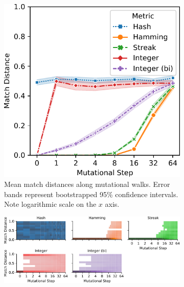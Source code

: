 \begin{figure}[!htbp]
\begin{center}

\begin{subfigure}[b]{\linewidth}
\begin{minipage}{\linewidth}
\centering
\includegraphics[width=0.75\linewidth]{img/mutational_walk/bitweight=0dot5+seed=1+title=mutational_walk_lineplot_ci+_data_hathash_hash=8bf152d87daa9cb7+_script_fullcat_hash=44400a7961ad5f3b+ext=}

\end{minipage}
\begin{minipage}{\linewidth}
\caption{
Mean match distances along mutational walks.
Error bands represent bootstrapped 95\% confidence intervals.
Note logarithmic scale on the $x$ axis.
}
\end{minipage}
\end{subfigure}

\begin{subfigure}[b]{\linewidth}
\begin{minipage}{\linewidth}
\centering
\includegraphics[width=\linewidth]{img/mutational_walk/bitweight=0dot5+seed=1+title=mutational_walk_heatplot+_data_hathash_hash=8bf152d87daa9cb7+_script_fullcat_hash=3e4b97b1d7992e5a+ext=}


\end{minipage}
\end{subfigure}
\end{center}
\end{figure}
